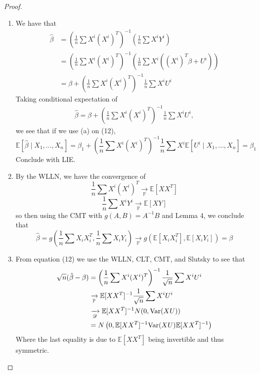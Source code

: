 \documentclass[10pt, oneside]{article}
\newcommand{\bbP}{\mathbb{P}}
\newcommand{\Var}{\text{Var}}
\newcommand{\bbE}{\mathbb{E}}
\theoremstyle{definition}
\begin{document}
\begin{proof}
    \begin{enumerate}
        \item We have that 
        \begin{align*}
            \hat{\beta} &= \left(\frac{1}{n}\sum X^i (X^i)^T\right)^{-1} \left(\frac{1}{n}\sum X^i Y^i\right)\\
            &= \left(\frac{1}{n}\sum X^i (X^i)^T\right)^{-1} \left(\frac{1}{n}\sum X^i ((X^i)^T\beta + U^i)\right)\\
            &= \beta + \left( \frac{1}{n}\sum X^i(X^i)^T\right)^{-1} \frac{1}{n}\sum X^iU^i
        \end{align*}
        Taking conditional expectation of 
        \begin{align}
            \hat{\beta} = \beta + \left( \frac{1}{n}\sum X^i(X^i)^T\right)^{-1} \frac{1}{n}\sum X^iU^i,
        \end{align} 
        we see that if we use (a) on (12), 
        \[\bbE[\hat \beta \mid X_1, \dots, X_n] = \beta_1 +\left( \frac{1}{n}\sum X^i(X^i)^T\right)^{-1} \frac{1}{n}\sum X^i\bbE[U^i \mid X_1, \dots, X_n]  = \beta_1\] Conclude with LIE.
        \item By the WLLN, we have the convergence of 
        \[\frac{1}{n}\sum X^i (X^i)^T \xrightarrow[\bbP]{}\bbE[XX^T]\]
        \[\frac{1}{n}\sum X^i Y^i \xrightarrow[\bbP]{} \bbE[XY]\] so then using the CMT with $g(A,B) = A^{-1}B$ and Lemma 4, we conclude that 
        \[\hat{\beta} = g(\frac{1}{n}\sum X_i X_i^T, \frac{1}{n}\sum X_i Y_i)\xrightarrow[\bbP]{}g(\bbE[X_iX_i^T], \bbE[X_iY_i])  = \beta\]
        \item From equation (12) we use the WLLN, CLT, CMT, and Slutsky to see that
        \begin{align*}
            \sqrt{n}(\hat \beta - \beta) &=  \left( \frac{1}{n}\sum X^i(X^i)^T\right)^{-1} \frac{1}{\sqrt{n}}\sum X^iU^i\\
            &\xrightarrow[\bbP]{}\bbE[XX^T]^{-1} \frac{1}{\sqrt{n}}\sum X^iU^i\\
            &\xrightarrow[\cal D]{}\bbE[XX^T]^{-1}N(0, \Var(XU))\\
            &= N\left(0, \bbE[XX^T]^{-1}\Var(XU)\bbE[XX^T]^{-1}\right)
        \end{align*}
        Where the last equality is due to $\bbE[XX^T]$ being invertible and thus symmetric. 
    \end{enumerate}
\end{proof}
\end{document}
